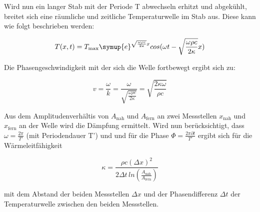       Wird nun ein langer Stab mit der Periode T abwechseln erhitzt und abgekühlt, breitet sich eine räumliche und zeitliche Temperaturwelle im Stab aus. 
      Diese kann wie folgt beschrieben werden: 

      \begin{equation}
      T(x,t) = T_\text{max} \symup{e}^{\sqrt{\frac{\omega \rho c}{2 \kappa}}x} cos(\omega t - \sqrt{\frac{\omega \rho c}{2 \kappa}} x)
        \label{eqn:temperaturwelle}
      \end{equation}  

      Die Phasengeschwindigkeit mit der sich die Welle fortbewegt ergibt sich zu:

      \begin{equation}
      v = \frac{\omega}{k} = \frac{\omega}{\sqrt{\frac{\omega \rho c}{2 \kappa}}} = \sqrt{\frac{2 \kappa \omega}{\rho c}}
        \label{eqn:phasengeschwindigkeit}
      \end{equation}

      Aus dem Amplitudenverhältis von $A_\text{nah}$ und $A_\text{fern}$ an zwei Messstellen $x_\text{nah}$ und $x_\text{fern}$ an der Welle wird die Dämpfung ermittelt.
      Wird nun berücksichtigt, dass $\omega = \frac{2 \pi}{T'}$ (mit Periodendauer T') und und für die Phase $\Phi = \frac{2 \pi \partial t}{T'}$ ergibt sich für die Wärmeleitfähigkeit

      \begin{equation}
      \kappa = \frac{\rho c (\Delta x)^2}{2 \Delta t \, ln (\frac{A_\text{nah}}{A_\text{fern}})}
        \label{eqn:waermeleitfaehigkeit}
      \end{equation}

      mit dem Abstand der beiden Messstellen $\Delta x$ und der Phasendifferenz $\Delta t$ der Temperaturwelle zwischen den beiden Messstellen.
